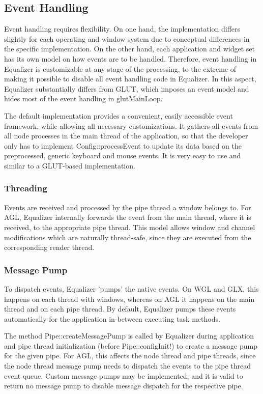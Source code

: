\documentclass[10pt,a4]{scrartcl}
\begin{document}
\subsection{\label{sEventHandling}Event Handling}

Event handling requires flexibility. On one hand, the implementation
differs slightly for each operating and window system due to conceptual
differences in the specific implementation. On the other hand, each
application and widget set has its own model on how events are to be
handled. Therefore, event handling in Equalizer is customizable at any
stage of the processing, to the extreme of making it possible to disable
all event handling code in Equalizer. In this aspect, Equalizer
substantially differs from GLUT, which imposes an event model and hides
most of the event handling in \textsf{glutMainLoop}.

The default implementation provides a convenient, easily accessible
event framework, while allowing all necessary customizations. It gathers
all events from all node processes in the main thread of the
application, so that the developer only has to implement
\textsf{Config::processEvent} to update its data based on the
preprocessed, generic keyboard and mouse events. It is very easy to use
and similar to a GLUT-based implementation.


\subsubsection{Threading}

Events are received and processed by the pipe thread a window belongs
to. For AGL, Equalizer internally forwards the event from the main
thread, where it is received, to the appropriate pipe thread. This model allows
window and channel modifications which are naturally thread-safe, since they are
executed from the corresponding render thread.

\subsubsection{\label{sMessagePump}Message Pump}

To dispatch events, Equalizer 'pumps' the native events. On WGL and GLX, this
happens on each thread with windows, whereas on AGL it happens on the main
thread and on each pipe thread. By default, Equalizer pumps these events
automatically for the application in-between executing task methods.

The method \textsf{Pipe::createMessagePump} is called by Equalizer during
application and pipe thread initialization (before \textsf{Pipe::configInit}!)
to create a message pump for the given pipe. For AGL, this affects the node
thread and pipe threads, since the node thread message pump needs to dispatch
the events to the pipe thread event queue. Custom message pumps may be
implemented, and it is valid to return no message pump to disable message
dispatch for the respective pipe.
\end{document}

